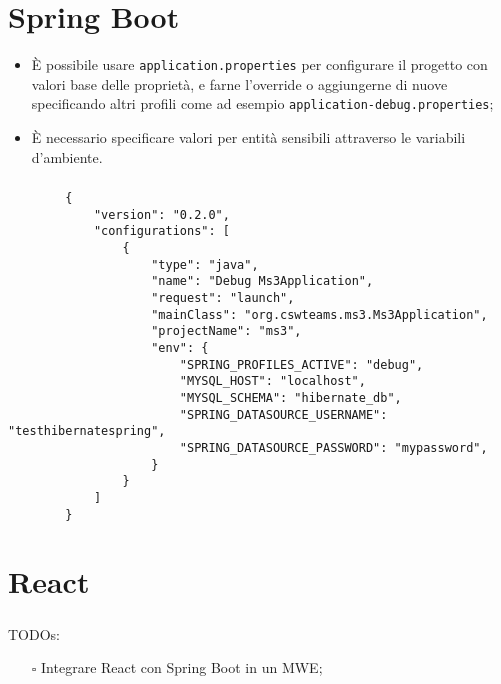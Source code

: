 \documentclass[compress]{beamer}
\begin{document}
\section{Spring Boot}
\begin{frame}{\secname}
    \begin{itemize}
        \item È possibile usare \texttt{application.properties} per configurare il
        progetto con valori base delle proprietà, e farne l'override o aggiungerne di nuove
        specificando altri profili come ad esempio \texttt{application-debug.properties};
        \item È necessario specificare valori per entità sensibili attraverso le variabili
        d'ambiente.
    \end{itemize}
\end{frame}
\begin{frame}[fragile]
    \frametitle{\secname}
    \begin{verbatim}
        {
            "version": "0.2.0",
            "configurations": [
                {
                    "type": "java",
                    "name": "Debug Ms3Application",
                    "request": "launch",
                    "mainClass": "org.cswteams.ms3.Ms3Application",
                    "projectName": "ms3",
                    "env": {
                        "SPRING_PROFILES_ACTIVE": "debug",
                        "MYSQL_HOST": "localhost",
                        "MYSQL_SCHEMA": "hibernate_db",
                        "SPRING_DATASOURCE_USERNAME": "testhibernatespring",
                        "SPRING_DATASOURCE_PASSWORD": "mypassword",
                    }
                }
            ]
        }
    \end{verbatim}  
\end{frame}

\section{React}

\begin{frame}
    \frametitle{\secname}

    TODOs:
    \begin{itemize}
        \item[$\square$] Integrare React con Spring Boot in un MWE;
    \end{itemize}

\end{frame}
\end{document}
